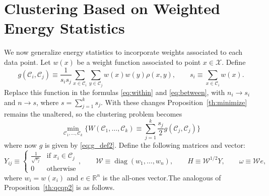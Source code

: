 \documentclass[aps,preprint,nofootinbib,floatfix]{revtex4-1}
\DeclareMathOperator{\diag}{diag}
\newcommand\C{{\mathcal{C}}}
\newcommand\e{e}
\newcommand\om{\omega}
\begin{document}
\section{Clustering Based on Weighted Energy Statistics}
\label{sec:weighted}

We now generalize energy statistics to incorporate
weights associated to each data point.
Let $w(x)$ be a weight function associated to point $x \in \mathcal{X}$.
Define
\begin{equation}
\label{eq:g_def2}
g(\C_i, \C_j) \equiv \dfrac{1}{s_i s_j} \sum_{x\in \C_i}\sum_{y\in\C_j}
w(x)w(y) \rho(x,y), \qquad s_i \equiv \sum_{x\in\C_i} w(x).
\end{equation}
Replace this function in the formulas \eqref{eq:within} and
\eqref{eq:between}, with 
$n_i \to s_i$ and $n \to s$, where $s = \sum_{j=1}^k s_j$.
With these
changes Proposition~\ref{th:minimize} remains the unaltered, so the
clustering problem becomes
\begin{equation}
\label{eq:minimize2}
\min_{\C_1, \dotsc, \C_k} 
\bigg\{
W(\C_1,\dotsc,\C_k) \equiv \sum_{j=1}^k \dfrac{s_j}{2} g(\C_j,\C_j)
\bigg\}
\end{equation}
where now $g$ is given by \eqref{eq:g_def2}. 
Define the following matrices and vector:
\begin{equation}
\label{eq:weighted_matrices}
Y_{ij} \equiv \begin{cases}
\tfrac{1}{\sqrt{s_j}} & \mbox{if $x_i \in \C_j$} \\
0 & \mbox{otherwise}
\end{cases}, \qquad
\mathcal{W} \equiv \diag(w_1,\dotsc,w_n), \qquad
H \equiv \mathcal{W}^{1/2} Y, \qquad
\om \equiv \mathcal{W} \e,
\end{equation}
where $w_i = w(x_i)$ and $\e \in \mathbb{R}^n$ is the all-ones
vector.The analogous of
Proposition~\ref{th:qcqp2} is as follows.
\end{document}
